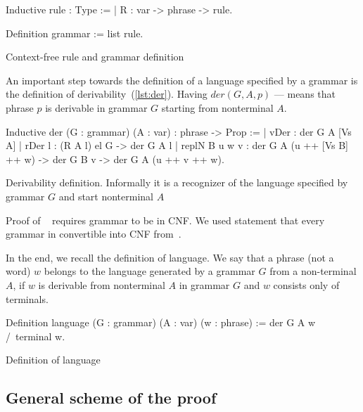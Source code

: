 \begin{listing}[h]
    \begin{pyglist}[language=coq, numbers=none, numbersep=5pt]
  Inductive rule : Type :=
  | R : var -> phrase -> rule.
        
  Definition grammar := list rule.
    \end{pyglist}
    \caption{Context-free rule and grammar definition}
    \label{lst:grm}
\end{listing}

An important step towards the definition of a language specified by a grammar is the definition of derivability~(\ref{lst:der}). Having $der(G, A, p)$ --- means that phrase $p$ is derivable in grammar $G$ starting from nonterminal $A$.

\begin{listing}[h]
    \begin{pyglist}[language=coq, numbers=none, numbersep=5pt]
  Inductive der (G : grammar) 
                (A : var) : phrase -> Prop :=
  | vDer : der G A [Vs A]
  | rDer l : (R A l) el G -> der G A l
  | replN B u w v : 
      der G A (u ++ [Vs B] ++ w) -> 
      der G B v -> der G A (u ++ v ++ w).
    \end{pyglist}
    \caption{Derivability definition. Informally it is a recognizer of the language specified by grammar $G$ and start nonterminal $A$}
    \label{lst:der}
\end{listing}

Proof of ~\cite{beigelproof}  requires grammar to be in CNF. We used statement that every grammar in convertible into CNF from~\cite{smolkaHofmann2016}.

In the end, we recall the definition of language. We say that a phrase (not a word) $ w $ belongs to the language generated by a grammar $G$ from a non-terminal $A$, if $ w $ is derivable from nonterminal $ A $ in grammar $ G $ and $ w $ consists only of terminals.

\begin{listing}[h]
	\begin{pyglist}[language=coq, numbers=none, numbersep=5pt]
  Definition language 
            (G : grammar) (A : var) (w : phrase) :=
    der G A w /\ terminal w.
	\end{pyglist}
	\caption{Definition of language}
	\label{lst:lang}
\end{listing}



\subsection{General scheme of the proof}

